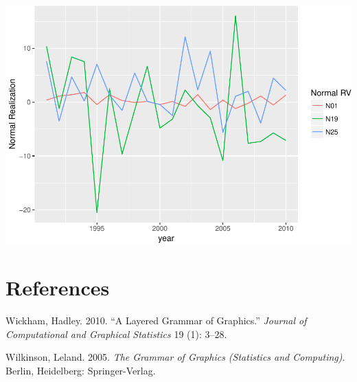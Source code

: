 \documentclass[11pt,]{article}
\begin{document}
\includegraphics{Intro_graphics_files/figure-latex/wide_vs_long-2.pdf}

\section*{References}\label{references}

\hypertarget{refs}{}
\hypertarget{ref-Wickham:2010}{}
Wickham, Hadley. 2010. ``A Layered Grammar of Graphics.'' \emph{Journal
of Computational and Graphical Statistics} 19 (1): 3--28.

\hypertarget{ref-Wilkinson:2005}{}
Wilkinson, Leland. 2005. \emph{The Grammar of Graphics (Statistics and
Computing)}. Berlin, Heidelberg: Springer-Verlag.
\end{document}
